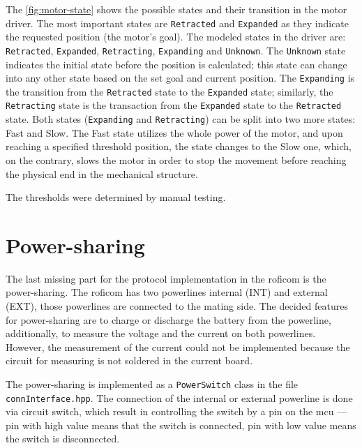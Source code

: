 \documentclass[
  digital,     %
  oneside,     %
  nosansbold,  %
  nocolorbold, %
  nolof,         %
  nolot,         %
]{fithesis4}
\begin{document}
The \autoref{fig:motor-state} shows the possible states and their transition in the motor driver.
The most important states are \lstinline|Retracted| and \lstinline|Expanded| as they indicate the
requested position (the motor's goal). The modeled states in the driver are: \lstinline|Retracted|,
\lstinline|Expanded|, \lstinline|Retracting|, \newline \lstinline|Expanding| and
\lstinline|Unknown|. The \lstinline|Unknown| state indicates the initial state before the position
is calculated; this state can change into any other state based on the set goal and current
position. The \lstinline|Expanding| is the transition from the \lstinline|Retracted| state to the
\lstinline|Expanded| state; similarly, the \lstinline|Retracting| state is the transaction from the
\lstinline|Expanded| state to the \lstinline|Retracted| state. Both states (\lstinline|Expanding|
and \lstinline|Retracting|) can be split into two more states: Fast and Slow. The Fast state
utilizes the whole power of the motor, and upon reaching a specified threshold position, the state
changes to the Slow one, which, on the contrary, slows the motor in order to stop the movement
before reaching the physical end in the mechanical structure.

The thresholds were determined by manual testing.

\section{ Power-sharing }

The last missing part for the protocol implementation in the \acrshort{roficom} is the
power-sharing. The \acrshort{roficom} has two powerlines internal (INT) and external (EXT), those
powerlines are connected to the mating side. The decided features for power-sharing are to charge or
discharge the battery from the powerline, additionally, to measure the voltage and the current on
both powerlines. However, the measurement of the current could not be implemented because the
circuit for measuring is not soldered in the current board.

The power-sharing is implemented as a \lstinline|PowerSwitch| class in the file
\lstinline|connInterface.hpp|. The connection of the internal or external powerline is done via
circuit switch, which result in controlling the switch by a pin on the \acrshort{mcu} --- pin with
high value means that the switch is connected, pin with low value means the switch is disconnected.
\end{document}

